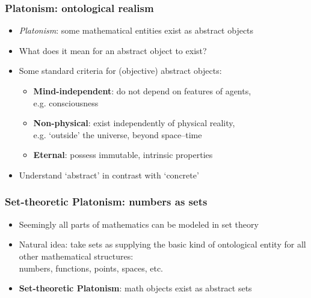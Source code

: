 \begin{frame}
\frametitle{Platonism: ontological realism}

\begin{itemize}[<+->]

\item \emph{Platonism}: some mathematical entities exist as abstract objects

\item What does it mean for an abstract object to exist?

\item Some standard criteria for (objective) abstract objects:

\bigskip

\begin{itemize}

\item \textbf{Mind-independent}: do not depend on features of agents, \\ e.g. consciousness

\item \textbf{Non-physical}: exist independently of physical reality, \\ e.g. `outside' the universe, beyond space--time

\item \textbf{Eternal}: possess immutable, intrinsic properties

\end{itemize}

\medskip

\item Understand `abstract' in contrast with `concrete'


\end{itemize}
\end{frame}

\begin{frame}
\frametitle{Set-theoretic Platonism: numbers as sets}

\begin{itemize}[<+->]

\item Seemingly all parts of mathematics can be modeled in set theory

\item Natural idea: take sets as supplying the basic kind of ontological entity for all other mathematical structures: \\ numbers, functions, points, spaces, etc.

\item \textbf{Set-theoretic Platonism}: math objects exist as abstract sets

\end{itemize}
\end{frame}

